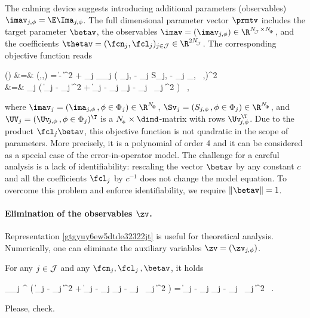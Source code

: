 The calming device suggests introducing additional parameters (observables) 
\( \imav_{j,\sph} = \E \Ima_{j,\sph} \).
The full dimensional parameter vector \( \prmtv \) includes
the target parameter \( \betav \), the observables \( \imav = (\imav_{j,\sph}) \in \R^{\nJJJ \times \nSph} \), 
and the coefficients \( \thetav = (\fcn_{j},\fcl_{j})_{j \in \JJJ} \in \R^{2\nJJJ} \).
The corresponding objective function reads
\begin{EQA}
	\LL(\prmtv)
	&=&
	\LL(\betav,\thetav,\imav)
	=
	 \| \Imav - \imav \|^{2} 
	+  \sum_{j \in \JJJ} \sum_{\sph \in \Sph_{j}} 
		\bigl( \ima_{j,\sph} - \fcn_{j} S_{j,\sph} - \fcl_{j} \langle \Uv_{\jm,\sph} \, ,\betav \rangle \bigr)^{2} 
	\\
	&=&
	 \sum_{j \in \JJJ} 
	\bigl( \| \Imav_{j} - \imav_{j} \|^{2} + \bigl\| \imav_{j} - \fcn_{j} \Sv_{j} - \fcl_{j} \, \UV_{j} \betav \bigr\|^{2} \bigr) 
	\, ,
\label{gtgyuy6ew5dtde32322jt}
\end{EQA}
where \( \imav_{j} = (\ima_{j,\sph} \, , \sph \in \Sph_{j}) \in \R^{\nSph} \),
\( \Sv_{j} = (S_{j,\sph} \, , \sph \in \Sph_{j}) \in \R^{\nSph} \),
and \( \UV_{j} = (\Uv_{\jm,\sph} \, , \sph \in \Sph_{j})^{\T} \) is a \( \nSph \times \dimd \)-matrix with rows \( \Uv_{\jm,\sph}^{\T} \).
Due to the product \( \fcl_{j} \betav \), this objective function is not quadratic in the scope of parameters.
More precisely, it is a polynomial of order 4 and it can be considered as a special case of the error-in-operator model.
The challenge for a careful analysis is a lack of identifiability: rescaling the vector \( \betav \) by any constant
\( c \) and all the coefficients \( \fcl_{j} \) by \( c^{-1} \) does not change the model equation. 
To overcome this problem and enforce identifiability, we require \( \| \betav \| = 1 \).

\paragraph{Elimination of the observables \( \zv \).}
Representation \eqref{gtgyuy6ew5dtde32322jt} is useful for theoretical analysis.
Numerically, one can eliminate the auxiliary variables \( \zv = (\zv_{j,\sph}) \).

\begin{lemma}
For any \( j \in \mathcal{J} \) and any
\( \fcn_{j},\fcl_{j} \, , \betav \), it holds
\begin{EQA}[c]
	\inf_{\imav_{j} \in \R^{\nSph}} \Bigl( 
		\| \Imav_{j} - \imav_{j} \|^{2} 
		+ \bigl\| \imav_{j} - \fcn_{j} \Sv_{j} - \fcl_{j} \, \UV_{j} \betav \bigr\|^{2} 
	\Bigr) 
	=
	 \bigl\| \Imav_{j} - \fcn_{j} \Sv_{j} - \fcl_{j} \, \UV_{j} \betav \bigr\|^{2}
	\, .
\end{EQA}
\end{lemma}
{\color{blue} Please, check.}


